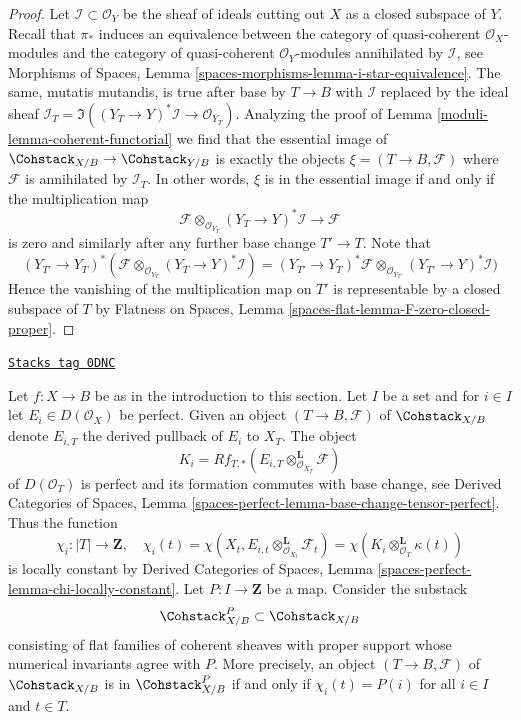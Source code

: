 \begin{proof}

Let $\mathcal{I} \subset \mathcal{O}_Y$ be the sheaf of ideals cutting
out $X$ as a closed subspace of $Y$. Recall that $\pi_*$ induces
an equivalence between the category of quasi-coherent $\mathcal{O}_X$-modules
and the category of quasi-coherent $\mathcal{O}_Y$-modules annihilated
by $\mathcal{I}$, see Morphisms of Spaces, Lemma
\ref{spaces-morphisms-lemma-i-star-equivalence}.
The same, mutatis mutandis, is true after base by $T \to B$ with
$\mathcal{I}$ replaced by the ideal sheaf
$\mathcal{I}_T = \Im((Y_T \to Y)^*\mathcal{I} \to \mathcal{O}_{Y_T})$.
Analyzing the proof of Lemma \ref{moduli-lemma-coherent-functorial}
we find that the essential image of
$\Cohstack_{X/B} \to \Cohstack_{Y/B}$
is exactly the objects $\xi = (T \to B, \mathcal{F})$
where $\mathcal{F}$ is annihilated by $\mathcal{I}_T$.
In other words, $\xi$ is in the essential image if and only if
the multiplication map
$$
\mathcal{F} \otimes_{\mathcal{O}_{Y_T}} (Y_T \to Y)^*\mathcal{I}
\longrightarrow
\mathcal{F}
$$
is zero and similarly after any further base change $T' \to T$.
Note that
$$
(Y_{T'} \to Y_T)^*(
\mathcal{F} \otimes_{\mathcal{O}_{Y_T}} (Y_T \to Y)^*\mathcal{I}) =
(Y_{T'} \to Y_T)^*\mathcal{F} \otimes_{\mathcal{O}_{Y_{T'}}}
(Y_{T'} \to Y)^*\mathcal{I})
$$
Hence the vanishing of the multiplication map on $T'$
is representable by a closed subspace of $T$ by
Flatness on Spaces, Lemma \ref{spaces-flat-lemma-F-zero-closed-proper}.
\end{proof}

\begin{definition}

\label{moduli-situation-numerical}
\href{https://stacks.math.columbia.edu/tag/0DNC}{\texttt{Stacks tag 0DNC}}

Let $f : X \to B$ be as in the introduction to this section. Let $I$
be a set and for $i \in I$ let $E_i \in D(\mathcal{O}_X)$ be perfect.
Given an object $(T \to B, \mathcal{F})$ of $\Cohstack_{X/B}$
denote $E_{i, T}$ the derived pullback of $E_i$ to $X_T$.
The object
$$
K_i = Rf_{T, *}(E_{i, T} \otimes_{\mathcal{O}_{X_T}}^\mathbf{L} \mathcal{F})
$$
of $D(\mathcal{O}_T)$ is perfect and its formation commutes with base change,
see Derived Categories of Spaces, Lemma
\ref{spaces-perfect-lemma-base-change-tensor-perfect}.
Thus the function
$$
\chi_i : |T| \longrightarrow \mathbf{Z},\quad
\chi_i(t) =
\chi(X_t, E_{i, t} \otimes_{\mathcal{O}_{X_t}}^\mathbf{L} \mathcal{F}_t) =
\chi(K_i \otimes_{\mathcal{O}_T}^\mathbf{L} \kappa(t))
$$
is locally constant by Derived Categories of Spaces, Lemma
\ref{spaces-perfect-lemma-chi-locally-constant}.
Let $P : I \to \mathbf{Z}$ be a map. Consider the substack
$$
\Cohstack^P_{X/B} \subset \Cohstack_{X/B}
$$
consisting of flat families of coherent sheaves with proper support
whose numerical invariants agree with $P$. More precisely, an object
$(T \to B, \mathcal{F})$ of $\Cohstack_{X/B}$ is in
$\Cohstack^P_{X/B}$ if and only if $\chi_i(t) = P(i)$ for all $i \in I$
and $t \in T$.
\end{definition}

